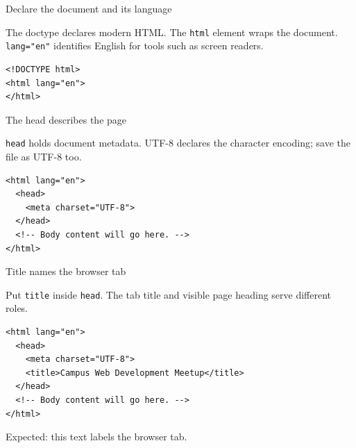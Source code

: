 \documentclass[aspectratio=169,12pt]{beamer}
\begin{document}
\begin{frame}[fragile]{Declare the document and its language}
\begin{conceptblock}
The doctype declares modern HTML. The \texttt{html} element wraps the document. \texttt{lang="en"} identifies English for tools such as screen readers.
\end{conceptblock}
\begin{lstlisting}
<!DOCTYPE html>
<html lang="en">
</html>
\end{lstlisting}

\end{frame}

\begin{frame}[fragile]{The head describes the page}
\begin{conceptblock}
\texttt{head} holds document metadata. UTF-8 declares the character encoding; save the file as UTF-8 too.
\end{conceptblock}
\begin{lstlisting}
<html lang="en">
  <head>
    <meta charset="UTF-8">
  </head>
  <!-- Body content will go here. -->
</html>
\end{lstlisting}

\end{frame}

\begin{frame}[fragile]{Title names the browser tab}
\begin{conceptblock}
Put \texttt{title} inside \texttt{head}. The tab title and visible page heading serve different roles.
\end{conceptblock}
\begin{lstlisting}
<html lang="en">
  <head>
    <meta charset="UTF-8">
    <title>Campus Web Development Meetup</title>
  </head>
  <!-- Body content will go here. -->
</html>
\end{lstlisting}

\small Expected: this text labels the browser tab.
\end{frame}
\end{document}
